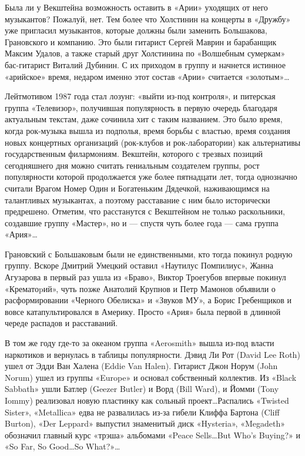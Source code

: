 \documentclass[16pt,a5paper,oneside]{book}
\begin{document}
Была ли у Векштейна возможность оставить в «Арии» уходящих от него музыкантов? Пожалуй, нет. Тем более что Холстинин на
концерты в «Дружбу» уже пригласил музыкантов, которые должны были заменить Большакова, Грановского и компанию. Это были
гитарист Сергей Маврин и барабанщик Максим Удалов, а также старый друг Холстинина по «Волшебным сумеркам» бас-гитарист
Виталий Дубинин. С их приходом в группу и начнется истинное «арийское» время, недаром именно этот состав «Арии»
считается «золотым»\ldots

Лейтмотивом 1987 года стал лозунг: «выйти из-под контроля», и питерская группа «Телевизор», получившая популярность в
первую очередь благодаря актуальным текстам, даже сочинила хит с таким названием. Это было время, когда рок-музыка вышла
из подполья, время борьбы с властью, время создания новых концертных организаций (рок-клубов и рок-лаборатории) как
альтернативы государственным филармониям. Векштейн, которого с трезвых позиций сегодняшнего дня можно считать гениальным
создателем группы, рост популярности которой продолжается уже более пятнадцати лет, тогда однозначно считали Врагом
Номер Один и Богатеньким Дядечкой, наживающимся на талантливых музыкантах, а поэтому расставание с ним было исторически
предрешено. Отметим, что расстанутся с Векштейном не только раскольники, создавшие группу «Мастер», но и — спустя чуть
более года — сама группа «Ария»\ldots

Грановский с Большаковым были не единственными, кто тогда покинул родную группу. Вскоре Дмитрий Умецкий оставил
«Наутилус Помпилиус», Жанна Агузарова в первый раз ушла из «Браво», Виктор Троегубов впервые покинул «Крематоpий», чуть
позже Анатолий Крупнов и Петр Мамонов объявили о расформировании «Черного Обелиска» и «Звуков МУ», а Борис Гребенщиков и
вовсе катапультировался в Америку. Просто «Ария» была первой в длинной череде распадов и расставаний.

В том же году где-то за океаном группа «Aerosmith» вышла из-под власти наркотиков и вернулась в таблицы популярности.
Дэвид Ли Рот (David Lee Roth) ушел от Эдди Ван Халена (Eddie Van Halen). Гитарист Джон Норум (John Norum) ушел из группы
«Europe» и основал собственный коллектив. Из «Black Sabbath» ушли Батлер (Geezer Butler) и Ворд (Bill Ward), и Йомми
(Tony Iommy) реализовал новую пластинку как сольный проект\ldots Распались «Twisted Sister», «Metallica» едва не
развалилась из-за гибели Клиффа Бартона (Cliff Burton), «Der Leppard» выпустил знаменитый диск «Hysteria», «Megadeth»
обозначил главный курс «трэша» альбомами «Peace Sells\ldots But Who's Buying?» и «So Far, So Good\ldots So What?»\ldots
\end{document}
